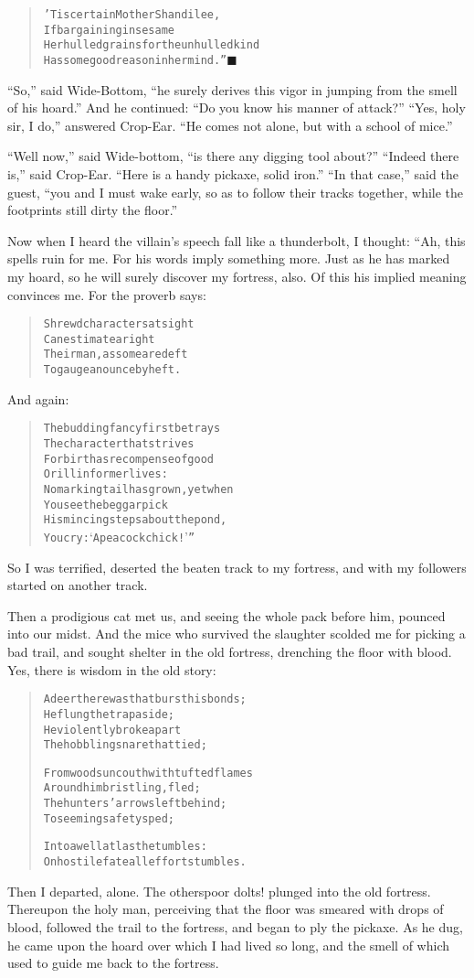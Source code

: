 \documentclass[article, twoside, 14pt]{memoir}
\newcommand{\qed}{\hfill \ensuremath{\blacksquare}}
\renewenvironment{verbatim}{%
\begin{quote}%
\vskip -10pt%
\begin{alltt}\normalfont\large}{\end{alltt}%
\end{quote}%
\vskip -10pt
} %
\begin{document}
\begin{verbatim}
'Tis certain Mother Shandilee,
If bargaining in sesame{\textemdash}
Her hulled grains for the unhulled kind{\textemdash}
Has some good reason in her mind.”\hyperref[s39]{\qed}
\end{verbatim}
``So,'' said Wide-Bottom,
``he surely derives this vigor in jumping from the smell of his hoard.''
And he continued: ``Do you know his manner of attack?''
``Yes, holy sir, I do,'' answered Crop-Ear.
``He comes not alone, but with a school of mice.''

``Well now,'' said Wide-bottom,
``is there any digging tool about?'' ``Indeed there is,'' said
Crop-Ear. ``Here is a handy pickaxe, solid iron.''
``In that case,'' said the guest,
``you and I must wake early, so as to follow their tracks together, while the footprints still dirty the floor.''

Now when I heard the villain's speech fall like a thunderbolt, I
thought: “Ah, this spells ruin for me. For his words imply
something more. Just as he has marked my hoard, so he will surely
discover my fortress, also. Of this his implied meaning convinces
me. For the proverb says:

\begin{verbatim}
Shrewd characters at sight
Can estimate aright
Their man, as some are deft
To gauge an ounce by heft.
\end{verbatim}
And again:

\begin{verbatim}
The budding fancy first betrays
    The character that strives
For birth as recompense of good
    Or ill in former lives:
No marking tail has grown, yet when
    You see the beggar pick
His mincing steps about the pond,
    You cry: ‘A peacock chick!’”
\end{verbatim}
So I was terrified, deserted the beaten track to my fortress, and
with my followers started on another track.

Then a prodigious cat met us, and seeing the whole pack before him,
pounced into our midst. And the mice who survived the slaughter
scolded me for picking a bad trail, and sought shelter in the old
fortress, drenching the floor with blood. Yes, there is wisdom in
the old story:

\begin{verbatim}
A deer there was that burst his bonds;
    He flung the trap aside;
He violently broke apart
    The hobbling snare that tied;

From woods uncouth with tufted flames
    Around him bristling, fled;
The hunters' arrows left behind;
    To seeming safety sped;

Into a well at last he tumbles:
On hostile fate all effort stumbles.
\end{verbatim}
Then I departed, alone. The others{\textemdash}poor dolts! plunged into the
old fortress. Thereupon the holy man, perceiving that the floor was
smeared with drops of blood, followed the trail to the
fortress, and began to ply the pickaxe. As he dug, he came upon the
hoard over which I had lived so long, and the smell of which used
to guide me back to the fortress.
\end{document}
